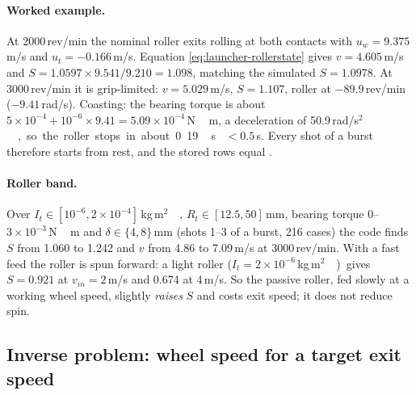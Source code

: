 \paragraph{Worked example.} At 2000\,\unit{rev/min}\assumed{} the nominal roller exits rolling at both
contacts with $u_w = 9.375$\,\unit{m/s}\predicted{} and $u_t = -0.166$\,\unit{m/s}\predicted. Equation
\eqref{eq:launcher-rollerstate} gives $v = 4.605$\,\unit{m/s}\derived{} and
$S = 1.0597\times9.541/9.210 = 1.098$\derived, matching the simulated $S = 1.0978$\predicted. At
3000\,\unit{rev/min} it is grip-limited: $v = 5.029$\,\unit{m/s}\predicted, $S = 1.107$\predicted, roller at
$-89.9$\,\unit{rev/min}\predicted{} ($-9.41$\,\unit{rad/s}\predicted). Coasting: the bearing torque is about
$5\times10^{-4} + 10^{-6}\times9.41 = 5.09\times10^{-4}$\,\unit{N\,m}\derived, a deceleration of
50.9\,\unit{rad/s$^2$}\derived, so the roller stops in about 0.19\,\unit{s}\derived{} $< 0.5$\,\unit{s}\assumed.
Every shot of a burst therefore starts from rest, and the stored  rows equal
.

\paragraph{Roller band.} Over $I_t \in [10^{-6}, 2\times10^{-4}]$\,\unit{kg\,m$^2$}\assumed,
$R_t \in [12.5, 50]$\,\unit{mm}\assumed, bearing torque 0--$3\times10^{-3}$\,\unit{N\,m}\assumed{} and
$\delta \in \{4, 8\}$\,\unit{mm}\assumed{} (shots 1--3 of a burst, 216\derived{} cases) the code finds
$S$ from 1.060\predicted{} to 1.242\predicted{} and $v$ from 4.86\predicted{} to 7.09\,\unit{m/s}\predicted{} at
3000\,\unit{rev/min}\assumed. With a fast feed the roller is spun forward: a light roller
($I_t = 2\times10^{-6}$\,\unit{kg\,m$^2$}\assumed) gives $S = 0.921$\predicted{} at $v_{in} = 2$\,\unit{m/s}\assumed{}
and 0.674\predicted{} at 4\,\unit{m/s}\assumed. So the passive roller, fed slowly at a working wheel speed, slightly \emph{raises} $S$ and
costs exit speed; it does not reduce spin.

\subsection{Inverse problem: wheel speed for a target exit speed}
\label{sec:launcher:inverse}

